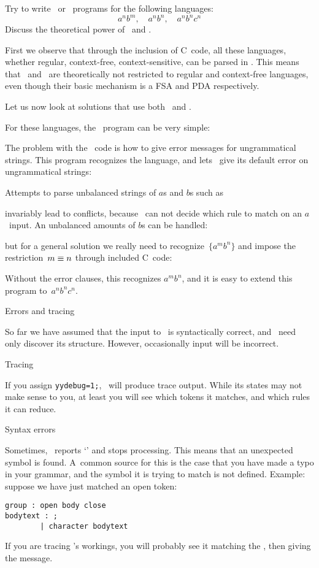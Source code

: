 \begin{594exercise}
Try to write \lex\ or \yacc\ programs for the following languages:
\[ a^nb^m, \quad a^nb^n, \quad a^nb^nc^n \]
Discuss the theoretical power of \lex\ and \yacc.
\end{594exercise}
\begin{answer}
First we observe that through the inclusion of C~code, all these
languages, whether regular, context-free, context-sensitive, can be
parsed in \lex. This means that \lex\ and \yacc\ are theoretically not
restricted to regular and context-free languages, even though their
basic mechanism is a FSA and PDA respectively.

Let us now look at solutions that use both \lex\ and \yacc.

For these languages, the \lex\ program can be very simple:

The problem with the \yacc\ code is how to give error messages for
ungrammatical strings. This program recognizes the language, and lets
\yacc\ give its default error on ungrammatical strings:

Attempts to parse unbalanced strings of $a$s and $b$s such as

invariably lead to conflicts, because \yacc\ can not decide which rule
to match on an $a$~input. An unbalanced amounts of $b$s can be
handled:

but for a general solution we really need to recognize~$\{a^mb^n\}$
and impose the restriction~$m\equiv\nobreak n$ through included
C~code:

Without the error clauses, this recognizes $a^mb^n$, and it is easy to
extend this program to~$a^nb^nc^n$.
\end{answer}

 {Errors and tracing}

So far we have assumed that the input to \yacc\ is syntactically
correct, and \yacc\ need only discover its structure. However,
occasionally input will be incorrect.

 {Tracing}

If you assign \verb+yydebug=1;+, \yacc\ will produce trace
output. While its states may not make sense to you, at least you will
see which tokens it matches, and which rules it can reduce.

 {Syntax errors}

Sometimes, \yacc\ reports `' and stops
processing. This means that an unexpected symbol is found.  A~common
source for this is the case that you have made a typo in your grammar,
and the symbol it is trying to match is not defined. Example: suppose
we have just matched an open token:
\begin{verbatim}
group : open body close
bodytext : ;
        | character bodytext
\end{verbatim}
If you are tracing \yacc's workings, you will probably see it matching
the , then giving the  message.

